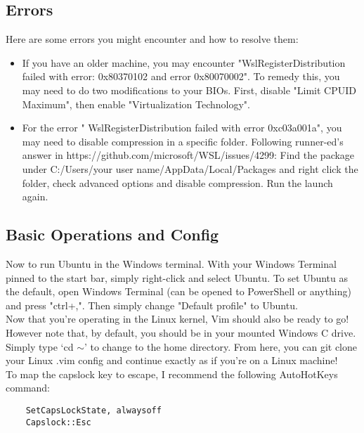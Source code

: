 \subsection{Errors}
Here are some errors you might encounter and how to resolve them:
\begin{itemize}
    \item If you have an older machine, you may encounter
        "WslRegisterDistribution failed with error: 0x80370102 and error 0x80070002". To
        remedy this, you may need to do two modifications to your BIOs. First, disable
        "Limit CPUID Maximum", then enable "Virtualization Technology".
    \item For the error " WslRegisterDistribution  failed with error
        0xc03a001a", you may need to disable compression in a specific folder.
        Following runner-ed's answer in
        https://github.com/microsoft/WSL/issues/4299: Find the package under
        C:/Users/\tlangle your user name\trangle/AppData/Local/Packages and right click the
        folder, check advanced options and disable compression. Run the launch
        again.
\end{itemize}

\subsection{Basic Operations and Config}
Now to run Ubuntu in the Windows terminal. With your Windows Terminal pinned to
the start bar, simply right-click and select Ubuntu. To set Ubuntu as the
default, open Windows Terminal (can be opened to PowerShell or anything) and
press "ctrl+,". Then simply change "Default profile" to Ubuntu.\\

Now that you're operating in the Linux kernel, Vim should also be ready to go!
However note that, by default, you should be in your mounted Windows C drive.
Simply type `cd $\sim$' to change to the home directory. From here, you can git
clone your Linux .vim config and continue exactly as if you're on a Linux
machine!\\

To map the capslock key to escape, I recommend the following AutoHotKeys
command:
\begin{lstlisting}
    SetCapsLockState, alwaysoff
    Capslock::Esc
\end{lstlisting}

